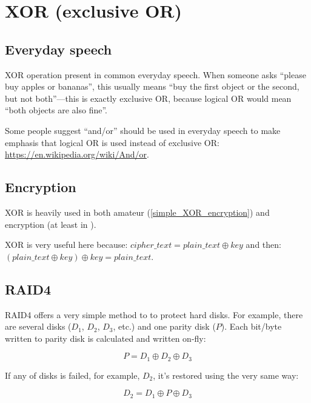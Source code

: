 ﻿\section{XOR (exclusive OR)}
\label{XOR_property}



\subsection{Everyday speech}

XOR operation present in common everyday speech.
When someone asks ``please buy apples or bananas'',
this usually means ``buy the first object or the second, but not both''---this is exactly exclusive OR,
because logical OR would mean ``both objects are also fine''.

Some people suggest ``and/or'' should be used in everyday speech to make emphasis that logical OR is used instead of
exclusive OR: \url{https://en.wikipedia.org/wiki/And/or}.

\subsection{Encryption}

XOR is heavily used in both amateur (\ref{simple_XOR_encryption}) and  encryption (at least in ).

XOR is very useful here because:
$cipher\_text = plain\_text \oplus key$ and then:
$(plain\_text \oplus key) \oplus key = plain\_text$.

\subsection{\ac{RAID}4}

\ac{RAID}4 offers a very simple method to to protect hard disks.
For example, there are several disks ($D_1$, $D_2$, $D_3$, etc.) and one parity disk ($P$).
Each bit/byte written to parity disk is calculated and written on-fly:

\begin{equation} \label{eq:RAID4}
P = D_1 \oplus D_2 \oplus D_3
\end{equation}

If any of disks is failed, for example, $D_2$, it's restored using the very same way:

\begin{equation}
D_2 = D_1 \oplus P \oplus D_3
\end{equation}

